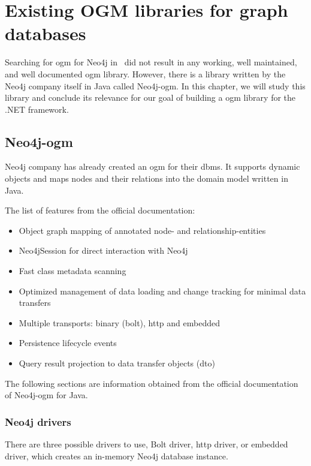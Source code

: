 \chapter {Existing OGM libraries for graph databases}

Searching for \acrshort{ogm} for Neo4j in \CS\ did not result in any working, well maintained, and well documented \acrshort{ogm} library.
However, there is a library written by the Neo4j company itself in Java called Neo4j-\acrshort{ogm}.
In this chapter, we will study this library and conclude its relevance for our goal of building a \acrshort{ogm} library for the .NET framework.

\section{Neo4j-\acrshort{ogm}}

Neo4j company has already created an \acrshort{ogm} for their \acrshort{dbms}.
It supports dynamic objects and maps nodes and their relations into the domain model written in Java.

The list of features from the official documentation: \cite{neo4j_neo4j_nodate}
\begin{itemize}
	\item Object graph mapping of annotated node- and relationship-entities
	\item Neo4jSession for direct interaction with Neo4j
	\item Fast class metadata scanning
	\item Optimized management of data loading and change tracking for minimal data transfers
	\item Multiple transports: binary (bolt), \acrshort{http} and embedded
	\item Persistence lifecycle events
	\item Query result projection to data transfer objects (\acrshort{dto})
\end{itemize}

The following sections are information obtained from the official documentation of Neo4j-\acrshort{ogm} for Java. \cite{neo4j_reference_nodate}

\subsection {Neo4j drivers}

There are three possible drivers to use, Bolt driver, \acrshort{http} driver, or embedded driver, which creates an in-memory Neo4j database instance.

